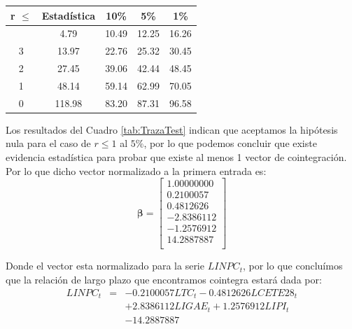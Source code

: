 \documentclass[
]{book}
\begin{document}
\begin{longtable}[]{@{}ccccc@{}}
\toprule\noalign{}
r \(\leq\) & Estadística & 10\% & 5\% & 1\% \\
\midrule\noalign{}
\endhead
\bottomrule\noalign{}
\endlastfoot
4 & 4.79 & 10.49 & 12.25 & 16.26 \\
3 & 13.97 & 22.76 & 25.32 & 30.45 \\
2 & 27.45 & 39.06 & 42.44 & 48.45 \\
1 & 48.14 & 59.14 & 62.99 & 70.05 \\
0 & 118.98 & 83.20 & 87.31 & 96.58 \\
\end{longtable}

Los resultados del Cuadro \ref{tab:TrazaTest} indican que aceptamos la hipótesis nula para el caso de \(r \leq 1\) al \(5\%\), por lo que podemos concluir que existe evidencia estadística para probar que existe al menos 1 vector de cointegración. Por lo que dicho vector normalizado a la primera entrada es:
\begin{equation}
    \boldsymbol{\beta} = \left[ 
    \begin{matrix}
    1.00000000 \\
    0.2100057 \\
    0.4812626 \\
    -2.8386112 \\
    -1.2576912 \\
    14.2887887 \\
    \end{matrix} \right]
\end{equation}

Donde el vector esta normalizado para la serie \(LINPC_t\), por lo que concluímos que la relación de largo plazo que encontramos cointegra estará dada por:
\begin{eqnarray*}
    LINPC_t & = & -0.2100057 LTC_t - 0.4812626 LCETE28_t \\
    &  & + 2.8386112 LIGAE_t + 1.2576912 LIPI_t \\
    &  & - 14.2887887
\end{eqnarray*}
\end{document}
